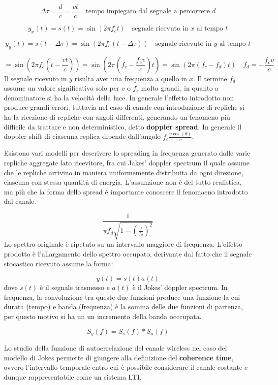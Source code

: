 \[
    \Delta \tau = \frac{d}{c} = \frac{vt}{c} \quad \text{tempo impiegato dal segnale a percorrere $d$}
\]

\[
    y_x(t) = s(t) = \sin(2\pi f_c t) \quad \text{segnale ricevuto in $x$ al tempo $t$}
\]

\[
    y_y(t) = s(t-\Delta \tau) = \sin(2\pi f_c (t-\Delta \tau)) \quad \text{segnale ricevuto in $y$ al tempo $t$}
\]

\[
    = \sin\left(2\pi f_c \left(t - \frac{vt}{c}\right)\right) = \sin\left(2\pi \left(f_c - \frac{f_c v}{c}\right) t\right) = \sin\left(2\pi \left(f_c - f_d \right) t \right) \quad \boxed{f_d = -\frac{f_c v}{c}}
\]
Il segnale ricevuto in $y$ risulta aver una frequenza a quello in $x$. Il termine $f_d$ assume un valore significativo solo per $v$ o $f_c$ molto grandi, in quanto a denominatore si ha la velocità della luce. In generale l'effetto introdotto non produce grandi errori, tuttavia nel caso di canale con introduzione di repliche si ha la ricezione di repliche con angoli differenti, generando un fenomeno più difficile da trattare e non deterministico, detto \textbf{doppler spread}.
In generale il doppler shift di ciascuna replica dipende dall'angolo $f_c \frac{v \cos(\theta)}{c}$, 

Esistono vari modelli per descrivere lo spreading in frequenza generato dalle varie repliche aggregate lato ricevitore, fra cui Jakes' doppler spectrum il quale assume che le repliche arrivino in maniera uniformemente distribuita da ogni direzione, ciascuna con stessa quantità di energia. L'assunzione non è del tutto realistica, ma più che la forma dello spread è importante conoscere il fenomaeno introdotto dal canale.



\[
  \frac{1}{\pi f_d \sqrt{1 - \left(\frac{f}{f_d}\right)^2}}
\]
Lo spettro originale è ripetuto su un intervallo maggiore di frequenza. L'effetto prodotto è l'allargamento dello spettro occupato, derivante dal fatto che il segnale stocastico ricevuto assume la forma:

\[
    y(t) = s(t) a(t)
\]
dove $s(t)$ è il segnale trasmesso e $a(t)$ è il Jokes' doppler spectrum. In frequenza, la convoluzione tra queste due funzioni produce una funzione la cui durata (tempo) e banda (frequenza) è la somma delle due funzioni di partenza, per questo motivo si ha un un incremento della banda occcupata.

\[
    S_y(f) = S_s(f) \ast S_a(f) 
\]

Lo studio della funzione di autocrrelazione del canale wireless nel caso del modello di Jokes permette di giungere alla definizione del \textbf{coherence time}, ovvero l'intervallo temporale entro cui è possibile considerare il canale costante e dunque rappresentabile come un sistema LTI.

